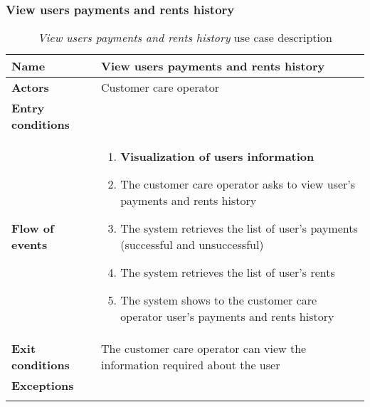 \subsubsection{View users payments and rents history}
\begin{longtable}{p{0.25\linewidth}p{0.75\linewidth}}
\toprule
\textbf{Name} & \textbf{View users payments and rents history} \\
\midrule
\textbf{Actors} &  Customer care operator\\
\midrule
\textbf{Entry conditions} & \\
\midrule
\textbf{Flow of events} & 
\begin{enumerate}
	\item \textbf{Visualization of users information}
	\item The customer care operator asks to view user's payments and rents history
	\item The system retrieves the list of user's payments (successful and unsuccessful)
	\item The system retrieves the list of user's rents
	\item The system shows to the customer care operator user's payments and rents history
\end{enumerate} \\
\midrule
\textbf{Exit conditions} & The customer care operator can view the information required about the user \\
\midrule
\textbf{Exceptions} & \\
\bottomrule
\caption{\emph{View users payments and rents history} use case description}
\end{longtable}

\clearpage
